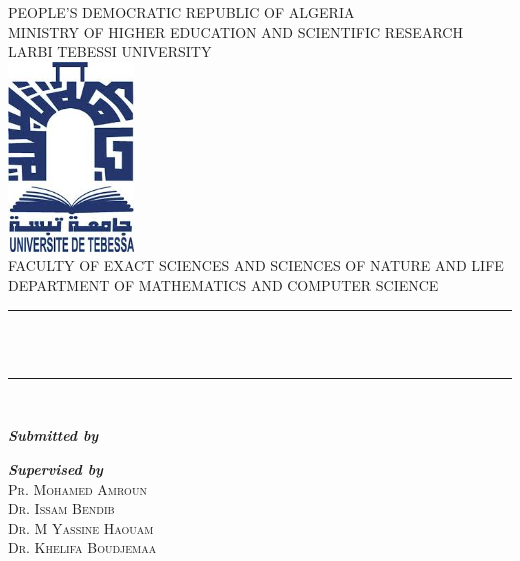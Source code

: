 \begin{titlepage}
	\begin{center}
		PEOPLE’S DEMOCRATIC REPUBLIC OF ALGERIA\\[0.4cm]
		MINISTRY OF HIGHER EDUCATION AND SCIENTIFIC RESEARCH\\[0.4cm]
		LARBI TEBESSI UNIVERSITY\\[0.4cm]
		\includegraphics[width=0.25\textwidth]{./images/univ-tebessa.jpg}\\[1cm]
		FACULTY OF EXACT SCIENCES AND SCIENCES OF NATURE AND LIFE\\[0.4cm]
		DEPARTMENT OF MATHEMATICS AND COMPUTER SCIENCE\\[0.5cm]
		\rule{\textwidth}{0.075cm}\\[0.4cm]
		\textsc{\huge \bfseries \@title}\\[1cm] 
		\rule{\textwidth}{0.075cm}\\[1cm]
		\begin{minipage}{0.4\textwidth}
			\begin{flushleft}
				\emph{\textbf{Submitted by}}\\
				\textsc{\@author}
			\end{flushleft}
		\end{minipage}
		\begin{minipage}{0.4\textwidth}
			\begin{flushright}
				\emph{\textbf{Supervised by}}\\
				\textsc{Pr. Mohamed Amroun}\\
				\textsc{Dr. Issam Bendib}\\
				\textsc{Dr. M Yassine Haouam}\\
				\textsc{Dr. Khelifa Boudjemaa}
			\end{flushright}
		\end{minipage}
		\vfill
		\@date
	\end{center}
\end{titlepage}

